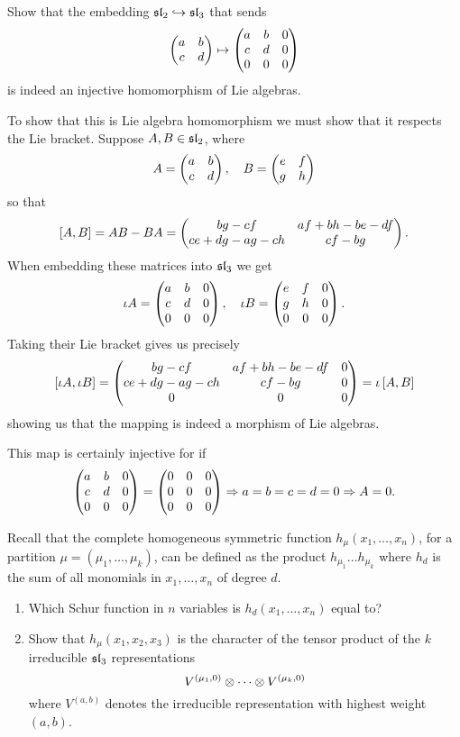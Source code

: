 \documentclass[12pt]{memoir}
\begin{document}
\begin{Ej}
    Show that the embedding $\mathfrak{sl}_2\hookrightarrow\mathfrak{sl}_3$ that sends 
    $$\begin{pmatrix} a & b \\ c & d \end{pmatrix}\mapsto\begin{pmatrix} a & b & 0 \\ c & d & 0 \\ 0 & 0 & 0 \end{pmatrix}$$
    is indeed an injective homomorphism of Lie algebras.
\end{Ej}

\begin{ptcbr}
    To show that this is Lie algebra homomorphism we must show that it respects the Lie bracket. Suppose $A,B\in\mathfrak{sl}_2$, where 
    $$A=\begin{pmatrix} a & b \\ c & d \end{pmatrix},\quad B=\begin{pmatrix} e & f \\ g & h \end{pmatrix}$$
    so that 
    $$\left\lbrack A,B\right\rbrack=AB-BA=\begin{pmatrix} bg-cf & af+bh-be-df \\ ce+dg-ag-ch & cf-bg \end{pmatrix}.$$
    When embedding these matrices into $\mathfrak{sl}_3$ we get 
    $$\iota A=\begin{pmatrix} a & b & 0 \\ c & d & 0 \\ 0 & 0 & 0 \end{pmatrix},\quad \iota B=\begin{pmatrix} e & f & 0 \\ g & h & 0 \\ 0 & 0 & 0 \end{pmatrix}.$$
    Taking their Lie bracket gives us precisely
    $$\left\lbrack\iota A,\iota B\right\rbrack=\begin{pmatrix} bg-cf & af+bh-be-df & 0 \\ ce+dg-ag-ch & cf-bg & 0 \\ 0 & 0 & 0 \end{pmatrix}=\iota\left\lbrack A,B\right\rbrack$$
    showing us that the mapping is indeed a morphism of Lie algebras.\par
    This map is certainly injective for if 
    $$\begin{pmatrix} a & b & 0 \\ c & d & 0 \\ 0 & 0 & 0 \end{pmatrix}=\begin{pmatrix} 0 & 0 & 0 \\ 0 & 0 & 0 \\ 0 & 0 & 0 \end{pmatrix}\Rightarrow a=b=c=d=0\Rightarrow A=0.$$
    
\end{ptcbr}

\begin{Ej}
    Recall that the complete homogeneous symmetric function $h_\mu(x_1,\dots,x_n)$, for a partition $\mu=(\mu_1,\dots,\mu_k)$,
can be defined as the product $h_{\mu_1}\dots h_{\mu_k}$ where $h_d$ is the sum of all monomials in $x_1,\dots,x_n$ of degree $d$.
\begin{enumerate}
    \item Which Schur function in $n$ variables is $h_d(x_1,\dots,x_n) $ equal to?
    \item Show that $h_\mu(x_1, x_2, x_3)$ is the character of the tensor product of the $k$ irreducible $\mathfrak{sl}_3$ representations
    $$V^{(\mu_1,0)}\otimes\cdots\otimes V^{(\mu_k,0)}$$
    where $V^{(a,b)}$ denotes the irreducible representation with highest weight $(a, b)$.
\end{enumerate}
\end{Ej}
\end{document}
